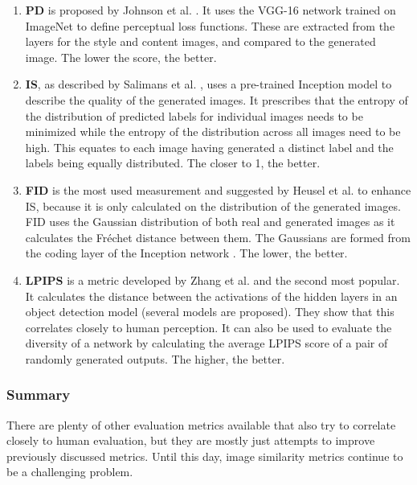 \begin{enumerate}
	\item \textbf{\gls{PD}} is proposed by Johnson et al. \cite{Johnson2016}.
	It uses the VGG-16 network \cite{Simonyan2015} trained on ImageNet \cite{Deng2009} to define perceptual loss functions.
	These are extracted from the layers for the style and content images, and compared to the generated image.
	The lower the score, the better.
	\item \textbf{\gls{IS}}, as described by Salimans et al. \cite{Salimans2016}, uses a pre-trained Inception model \cite{Szegedy2015} to describe the quality of the generated images.
	It prescribes that the entropy of the distribution of predicted labels for individual images needs to be minimized while the entropy of the distribution across all images need to be high.
	This equates to each image having generated a distinct label and the labels being equally distributed.
	The closer to 1, the better.
	\item \textbf{\gls{FID}} is the most used measurement and suggested by Heusel et al. \cite{Heusel2017} to enhance \gls{IS}, because it is only calculated on the distribution of the generated images.
	\gls{FID} uses the Gaussian distribution of both real and generated images as it calculates the Fréchet distance \cite{Frechet1957} between them.
	The Gaussians are formed from the coding layer of the Inception network \cite{Szegedy2015}.
	The lower, the better.
	\item \textbf{\gls{LPIPS}} is a metric developed by Zhang et al. \cite{Zhang2018} and the second most popular.
	It calculates the distance between the activations of the hidden layers in an object detection model (several models are proposed).
	They show that this correlates closely to human perception.
	It can also be used to evaluate the diversity of a network by calculating the average \gls{LPIPS} score of a pair of randomly generated outputs.
	The higher, the better.
\end{enumerate}

\subsubsection{Summary}
There are plenty of other evaluation metrics available that also try to correlate closely to human evaluation, but they are mostly just attempts to improve previously discussed metrics.
Until this day, image similarity metrics continue to be a challenging problem.

